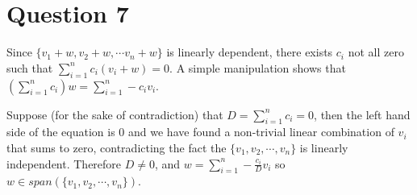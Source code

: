 \section*{Question 7}
Since $ \{v_1 + w, v_2 + w, \cdots v_n + w \}$ is linearly dependent, there exists $ c_i $ not all zero such that $ \sum\limits_{i=1}^{n} c_i(v_i + w) = 0 $. A simple manipulation shows that $ \left(\sum\limits_{i=1}^{n} c_i \right) w = \sum\limits_{i=1}^{n} -c_i v_i $.

Suppose (for the sake of contradiction) that $ D = \sum\limits_{i=1}^{n} c_i = 0 $, then the left hand side of the equation is 0 and we have found a non-trivial linear combination of $ v_i $ that sums to zero, contradicting the fact the $ \{v_1, v_2, \cdots, v_n \} $ is linearly independent. Therefore $ D \ne 0 $, and $ w = \sum\limits_{i=1}^{n} -\frac{c_i}{D} v_i $ so $ w \in span(\{v_1, v_2, \cdots, v_n \}) $.